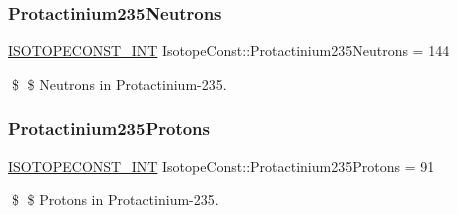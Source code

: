 \subsubsection{\texorpdfstring{Protactinium235\+Neutrons}{Protactinium235Neutrons}}
{\footnotesize\ttfamily \mbox{\hyperlink{group___isotope_const-_macros_ga5f18360b3e99483a35c32d789e62621c}{I\+S\+O\+T\+O\+P\+E\+C\+O\+N\+S\+T\+\_\+\+I\+NT}} Isotope\+Const\+::\+Protactinium235\+Neutrons = 144}

\$ \$ Neutrons in Protactinium-\/235. \mbox{\label{group___isotope_const-_protactinium-_pa235_ga44ac646d79508918a32c6eafc1fef5b0}} 
\subsubsection{\texorpdfstring{Protactinium235\+Protons}{Protactinium235Protons}}
{\footnotesize\ttfamily \mbox{\hyperlink{group___isotope_const-_macros_ga5f18360b3e99483a35c32d789e62621c}{I\+S\+O\+T\+O\+P\+E\+C\+O\+N\+S\+T\+\_\+\+I\+NT}} Isotope\+Const\+::\+Protactinium235\+Protons = 91}

\$ \$ Protons in Protactinium-\/235. 